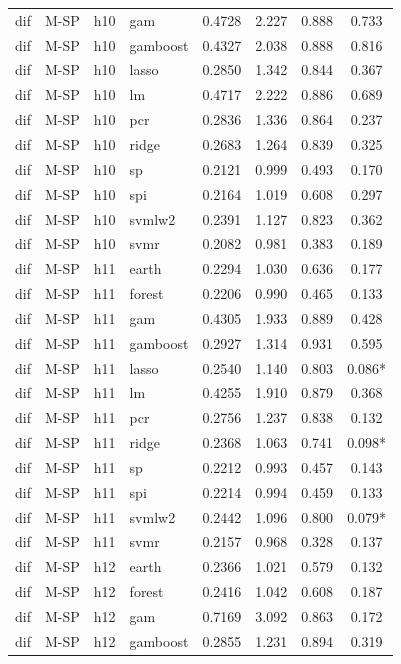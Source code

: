 \begin{ThreePartTable}
\begin{longtable}[t]{llclcccc}
dif & M-SP & h10 & gam & 0.4728 & 2.227 & 0.888 & 0.733\\
dif & M-SP & h10 & gamboost & 0.4327 & 2.038 & 0.888 & 0.816\\
dif & M-SP & h10 & lasso & 0.2850 & 1.342 & 0.844 & 0.367\\
dif & M-SP & h10 & lm & 0.4717 & 2.222 & 0.886 & 0.689\\
dif & M-SP & h10 & pcr & 0.2836 & 1.336 & 0.864 & 0.237\\
dif & M-SP & h10 & ridge & 0.2683 & 1.264 & 0.839 & 0.325\\
dif & M-SP & h10 & sp & 0.2121 & 0.999 & 0.493 & 0.170\\
dif & M-SP & h10 & spi & 0.2164 & 1.019 & 0.608 & 0.297\\
dif & M-SP & h10 & svmlw2 & 0.2391 & 1.127 & 0.823 & 0.362\\
dif & M-SP & h10 & svmr & 0.2082 & 0.981 & 0.383 & 0.189\\
\addlinespace
dif & M-SP & h11 & earth & 0.2294 & 1.030 & 0.636 & 0.177\\
dif & M-SP & h11 & forest & 0.2206 & 0.990 & 0.465 & 0.133\\
dif & M-SP & h11 & gam & 0.4305 & 1.933 & 0.889 & 0.428\\
dif & M-SP & h11 & gamboost & 0.2927 & 1.314 & 0.931 & 0.595\\
dif & M-SP & h11 & lasso & 0.2540 & 1.140 & 0.803 & 0.086*\\
dif & M-SP & h11 & lm & 0.4255 & 1.910 & 0.879 & 0.368\\
dif & M-SP & h11 & pcr & 0.2756 & 1.237 & 0.838 & 0.132\\
dif & M-SP & h11 & ridge & 0.2368 & 1.063 & 0.741 & 0.098*\\
dif & M-SP & h11 & sp & 0.2212 & 0.993 & 0.457 & 0.143\\
dif & M-SP & h11 & spi & 0.2214 & 0.994 & 0.459 & 0.133\\
dif & M-SP & h11 & svmlw2 & 0.2442 & 1.096 & 0.800 & 0.079*\\
dif & M-SP & h11 & svmr & 0.2157 & 0.968 & 0.328 & 0.137\\
\addlinespace
dif & M-SP & h12 & earth & 0.2366 & 1.021 & 0.579 & 0.132\\
dif & M-SP & h12 & forest & 0.2416 & 1.042 & 0.608 & 0.187\\
dif & M-SP & h12 & gam & 0.7169 & 3.092 & 0.863 & 0.172\\
dif & M-SP & h12 & gamboost & 0.2855 & 1.231 & 0.894 & 0.319\\

\end{longtable}
\end{ThreePartTable}
